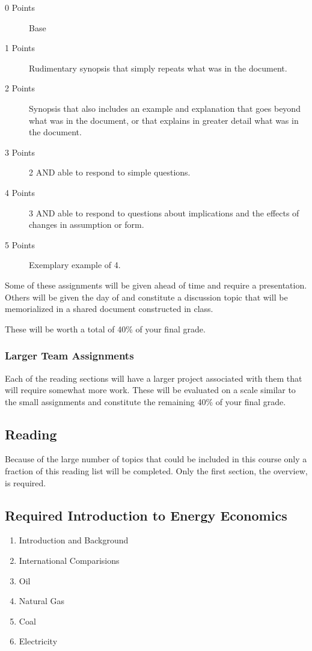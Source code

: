 \documentclass[letterpaper,10pt]{article}
\begin{document}
\begin{description}
\item[0 Points] Base
 \item[1 Points] Rudimentary synopsis that simply repeats what was in the document.
 \item[2 Points] Synopsis that also includes an example and explanation that goes beyond what was in the document, or that explains in greater detail what was in the document.
 \item[3 Points] 2 AND able to respond to simple questions.
 \item[4 Points] 3 AND able to respond to questions about implications and the effects of changes in assumption or form.
 \item[5 Points] Exemplary example of 4. 
 \end{description}

Some of these assignments will be given ahead of time and require a presentation.  Others will be given the day of and constitute a discussion topic that will be memorialized in a shared document constructed in class.

These will be worth a total of 40\% of your final grade.

\subsubsection{Larger Team Assignments}

Each of the reading sections will have a larger project associated with them that will require somewhat more work.  These will be evaluated on a scale similar to the small assignments and constitute the remaining 40\% of your final grade.


\subsection{Reading}

Because of the large number of topics that could be included in this course only a fraction of this reading list will be completed.  Only the first section, the overview, is required.

\subsection{Required Introduction to Energy Economics}
  \begin{enumerate}
    \item Introduction and Background
    \item International Comparisions
    \item Oil
    \item Natural Gas
    \item Coal
    \item Electricity
  
 \end{enumerate}
  
\end{document}
